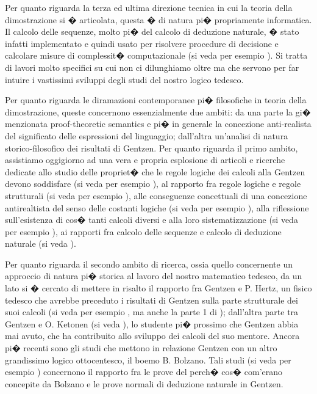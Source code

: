 \documentclass[a4paper,12pt]{aphex}
\begin{document}
Per quanto riguarda la terza ed ultima direzione tecnica in cui la teoria della dimostrazione si � articolata, questa � di natura pi� propriamente informatica. Il calcolo delle sequenze, molto pi� del calcolo di deduzione naturale, � stato infatti implementato e quindi usato per risolvere procedure di decisione e calcolare misure di complessit� computazionale (si veda per esempio \cite{cc}).   Si tratta di lavori molto specifici su cui non ci dilunghiamo oltre ma che servono per far intuire i vastissimi sviluppi degli studi del nostro logico tedesco.


Per quanto riguarda le diramazioni contemporanee pi� filosofiche in teoria della dimostrazione, queste concernono essenzialmente due ambiti: da una parte la gi� menzionata proof-theoretic semantics e pi� in generale la concezione anti-realista del significato delle espressioni del linguaggio; dall'altra un'analisi di natura storico-filosofico dei risultati di Gentzen. Per quanto riguarda il primo ambito, assistiamo oggigiorno ad una vera e propria esplosione di articoli e ricerche dedicate allo studio delle propriet� che le regole logiche dei calcoli alla Gentzen devono soddisfare (si veda per esempio \cite{read, read2} ), al rapporto fra regole logiche e regole strutturali  (si veda per esempio \cite{dosen, poggiolesi10}), alle conseguenze concettuali di una concezione antirealtista del senso delle costanti logiche (si veda per esempio \cite{dummett8, tennant}), alla riflessione sull'esistenza di cos� tanti calcoli diversi e alla loro sistematizzazione (si veda per esempio \cite{sambin, Steinberger}), ai rapporti fra calcolo delle sequenze e calcolo di deduzione naturale (si veda \cite{avron10, tennant2}).
  

Per quanto riguarda il secondo ambito di ricerca, ossia quello concernente un approccio di natura pi� storica al lavoro del nostro matematico tedesco, da un lato si � cercato di mettere in risalto il rapporto fra Gentzen e P. Hertz, un fisico tedesco che avrebbe preceduto i risultati di Gentzen sulla parte strutturale dei suoi calcoli (si veda per esempio \cite{Schroeder-Heister3, vonplato}, ma anche la parte 1 di \cite{beziau});  dall'altra parte tra Gentzen e O. Ketonen (si veda \cite{ketonen}), lo studente pi� prossimo che Gentzen abbia mai avuto, che ha contribuito allo sviluppo dei calcoli del suo mentore.
Ancora pi� recenti sono gli studi che mettono in relazione Gentzen con un altro grandissimo logico ottocentesco, il boemo B. Bolzano. Tali studi (si veda per esempio \cite{casari2, rumberg}) concernono il rapporto fra le prove del perch� cos� com'erano concepite da Bolzano e le prove normali di deduzione naturale in Gentzen. 
\end{document}
